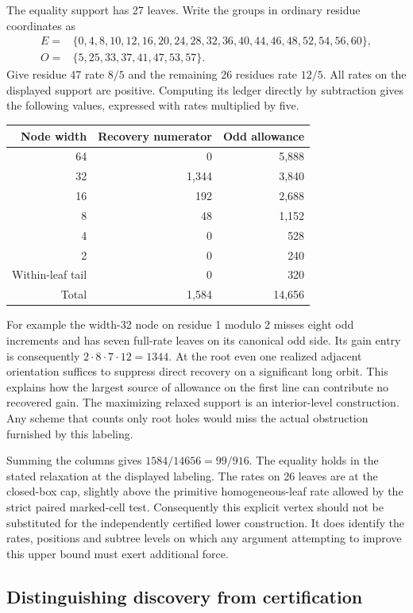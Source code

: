The equality support has 27 leaves. Write the groups in ordinary residue coordinates as
\[
\begin{aligned}
 E={}&\{0,4,8,10,12,16,20,24,28,32,36,40,44,46,48,52,54,56,60\},\\
 O={}&\{5,25,33,37,41,47,53,57\}.
\end{aligned}
\]
Give residue 47 rate \(8/5\) and the remaining 26 residues rate \(12/5\). All rates on the displayed support are positive. Computing its ledger directly by subtraction gives the following values, expressed with rates multiplied by five.
\begin{center}
\begin{tabular}{@{}rrr@{}}\toprule
Node width & Recovery numerator & Odd allowance\\\midrule
64 &0 &5,888\\
32 &1,344 &3,840\\
16 &192 &2,688\\
8  &48 &1,152\\
4  &0 &528\\
2  &0 &240\\
Within-leaf tail &0 &320\\\midrule
Total &1,584 &14,656\\\bottomrule
\end{tabular}
\end{center}
For example the width-32 node on residue 1 modulo 2 misses eight odd increments and has seven full-rate leaves on its canonical odd side. Its gain entry is consequently \(2\cdot8\cdot7\cdot12=1344\). At the root even one realized adjacent orientation suffices to suppress direct recovery on a significant long orbit. This explains how the largest source of allowance on the first line can contribute no recovered gain. The maximizing relaxed support is an interior-level construction. Any scheme that counts only root holes would miss the actual obstruction furnished by this labeling.

Summing the columns gives \(1584/14656=99/916\). The equality holds in the stated relaxation at the displayed labeling. The rates on 26 leaves are at the closed-box cap, slightly above the primitive homogeneous-leaf rate allowed by the strict paired marked-cell test. Consequently this explicit vertex should not be substituted for the independently certified lower construction. It does identify the rates, positions and subtree levels on which any argument attempting to improve this upper bound must exert additional force.

\subsection{Distinguishing discovery from certification}

